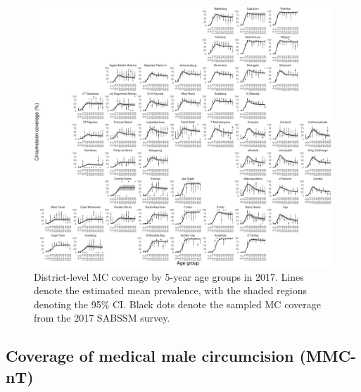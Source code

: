 \documentclass{article}
\begin{document}
\begin{appendix}

\begin{figure}[H]
	\centering
	\includegraphics[width = \linewidth]{Figures/suppmat/ModelFit/TotalPrev_5year_District_2017_withsurveypoints}
	\caption{District-level MC coverage by 5-year age groups in 2017. Lines denote the estimated mean prevalence, with the shaded regions denoting the 95\% CI. Black dots denote the sampled MC coverage from the 2017 SABSSM survey.}
\end{figure}


\subsection{Coverage of medical male circumcision (MMC-nT)}



\end{appendix}
\end{document}
